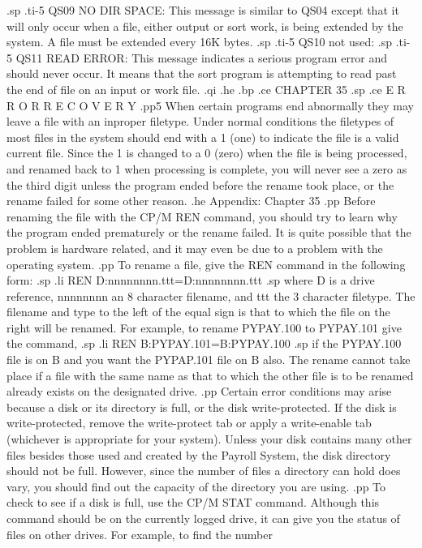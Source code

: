 .sp
.ti-5
QS09 NO DIR SPACE:
This message is similar to QS04 except that it will only occur when a file,
either output or sort work, is being extended by the system.  A file must be
extended every 16K bytes.
.sp
.ti-5
QS10 not used:
.sp
.ti-5
QS11 READ ERROR:
This message indicates a serious program error and should never occur.	It
means that the sort program is attempting to read past the end of file on
an input or work file.
.qi
.he
.bp
.ce
CHAPTER 35
.sp
.ce
E R R O R    R E C O V E R Y
.pp5
When certain programs end abnormally they may leave a file with an
inproper filetype.  Under normal conditions the filetypes of most
files in the system should end with a 1 (one) to indicate the
file is a valid current file.  Since the 1 is changed to a 0 (zero)
when the file is being processed, and renamed back to 1 when
processing is complete, you will never see a zero as the third digit
unless the program ended before the rename took place, or the rename
failed for some other reason.
.he Appendix: Chapter 35
.pp
Before renaming the file with the CP/M REN command, you should try to
learn why the program ended prematurely or the rename failed.  It is
quite possible that the problem is hardware related, and it may even be
due to a problem with the operating system.
.pp
To rename a file, give the REN command in the following form:
.sp
.li
	    REN D:nnnnnnnn.ttt=D:nnnnnnnn.ttt
.sp
where D is a drive reference, nnnnnnnn an 8 character filename, and ttt
the 3 character filetype.  The filename and type to the left of the
equal sign is that to which the file on the right will be renamed.  For
example, to rename PYPAY.100 to PYPAY.101 give the command,
.sp
.li
	    REN B:PYPAY.101=B:PYPAY.100
.sp
if the PYPAY.100 file is on B and you want the PYPAP.101 file on B also.
The rename cannot take place if a file with the same name as that
to which the other file is to be renamed already exists on the
designated drive.
.pp
Certain error conditions may arise because a disk or its directory is full,
or the disk write-protected.  If the disk is write-protected, remove
the write-protect tab or apply a write-enable tab (whichever is
appropriate for your system).  Unless your disk contains many other files
besides those used and created by the Payroll System, the disk directory
should not be full.  However, since the number of files a directory can
hold does vary, you should find out the capacity of the directory
you are using.
.pp
To check to see if a disk is full, use the CP/M STAT command.  Although
this command should be on the currently logged drive, it can give you
the status of files on other drives.  For example, to find the number
